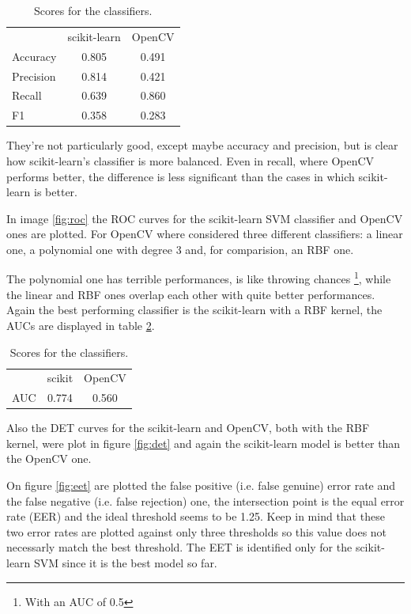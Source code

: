 \begin{table}[h!t]
    \centering
    \caption{Scores for the classifiers.}
    \label{tab:scores}
    \begin{tabular}{lcc}
        & scikit-learn & OpenCV \\
        Accuracy & 0.805 & 0.491 \\
        Precision & 0.814 & 0.421 \\
        Recall & 0.639 & 0.860 \\
        F1 & 0.358 & 0.283 \\
    \end{tabular}
\end{table}

They're not particularly good, except maybe accuracy and precision, but is clear how scikit-learn's classifier is more balanced. 
Even in recall, where OpenCV performs better, the difference is less significant than the cases in which scikit-learn is better.

In image \ref{fig:roc} the ROC curves for the scikit-learn SVM classifier and OpenCV ones are plotted.
For OpenCV where considered three different classifiers: a linear one, a polynomial one with degree 3 and, for comparision, an RBF one.

The polynomial one has terrible performances, is like throwing chances \footnote{With an AUC of 0.5}, while the linear and RBF ones overlap each other with quite better performances.
Again the best performing classifier is the scikit-learn with a RBF kernel, the AUCs are displayed in table \ref{tab:auc}.

\begin{table}[h!t]
    \centering
    \caption{Scores for the classifiers.}
    \label{tab:auc}
    \begin{tabular}{lcc}
        & scikit & OpenCV \\
        AUC & 0.774 & 0.560 \\
    \end{tabular}
\end{table}

Also the DET curves for the scikit-learn and OpenCV, both with the RBF kernel, were plot in figure \ref{fig:det} and again the scikit-learn model is better than the OpenCV one.

On figure \ref{fig:eet} are plotted the false positive (i.e. false genuine) error rate and the false negative (i.e. false rejection) one, the intersection point is the equal error rate (EER) and the ideal threshold seems to be 1.25.
Keep in mind that these two error rates are plotted against only three thresholds so this value does not necessarly match the best threshold. 
The EET is identified only for the scikit-learn SVM since it is the best model so far.

